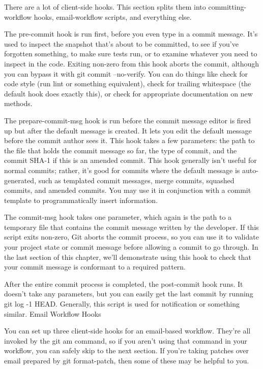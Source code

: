 There are a lot of client-side hooks. This section splits them into committing-workflow hooks, email-workflow scripts, and everything else.




The pre-commit hook is run first, before you even type in a commit message. It’s used to inspect the snapshot that’s about to be committed, to see if you’ve forgotten something, to make sure tests run, or to examine whatever you need to inspect in the code. Exiting non-zero from this hook aborts the commit, although you can bypass it with git commit --no-verify. You can do things like check for code style (run lint or something equivalent), check for trailing whitespace (the default hook does exactly this), or check for appropriate documentation on new methods.

The prepare-commit-msg hook is run before the commit message editor is fired up but after the default message is created. It lets you edit the default message before the commit author sees it. This hook takes a few parameters: the path to the file that holds the commit message so far, the type of commit, and the commit SHA-1 if this is an amended commit. This hook generally isn’t useful for normal commits; rather, it’s good for commits where the default message is auto-generated, such as templated commit messages, merge commits, squashed commits, and amended commits. You may use it in conjunction with a commit template to programmatically insert information.

The commit-msg hook takes one parameter, which again is the path to a temporary file that contains the commit message written by the developer. If this script exits non-zero, Git aborts the commit process, so you can use it to validate your project state or commit message before allowing a commit to go through. In the last section of this chapter, we’ll demonstrate using this hook to check that your commit message is conformant to a required pattern.

After the entire commit process is completed, the post-commit hook runs. It doesn’t take any parameters, but you can easily get the last commit by running git log -1 HEAD. Generally, this script is used for notification or something similar.
Email Workflow Hooks

You can set up three client-side hooks for an email-based workflow. They’re all invoked by the git am command, so if you aren’t using that command in your workflow, you can safely skip to the next section. If you’re taking patches over email prepared by git format-patch, then some of these may be helpful to you.

